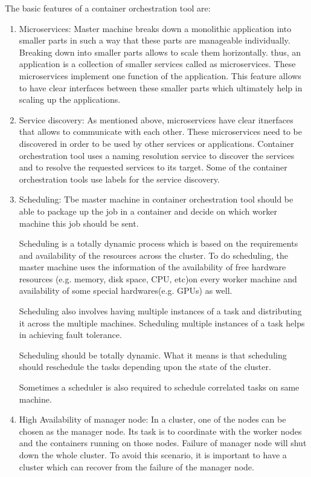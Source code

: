 The basic features of a container orchestration tool are:
\begin{enumerate}
\item Microservices:
Master machine breaks down a monolithic application into smaller parts in such a way that these parts are manageable individually. Breaking down into smaller parts allows to scale them horizontally. thus, an application is a collection of smaller services called as microservices. These microservices implement one function of the application. This feature allows to have clear interfaces between these smaller parts which ultimately help in scaling up the applications.

\item Service discovery:
As mentioned above, microservices have clear itnerfaces that allows to communicate with each other. These microservices need to be discovered in order to be used by other services or applications. Container orchestration tool uses a naming resolution service to discover the services and to resolve the requested services to its target. Some of the container orchestration tools use labels for the service discovery.

\item Scheduling: Tbe master machine in container orchestration tool should be able to package up the job in a container and decide on which worker machine this job should be sent. 

Scheduling is a totally dynamic process which is based on the requirements and availability of the resources across the cluster. To do scheduling, the master machine uses the information of the availability of free hardware resources (e.g. memory, disk space, CPU, etc)on every worker machine and availability of some special hardwares(e.g. GPUs) as well.

Scheduling also involves having multiple instances of a task and distributing it across the multiple machines. Scheduling multiple instances of a task helps in achieving fault tolerance.

Scheduling should be totally dynamic. What it means is that scheduling should reschedule the tasks depending upon the state of the cluster.

Sometimes a scheduler is also required to schedule correlated tasks on same machine.

\item High Availability of manager node: In a cluster, one of the nodes can be chosen as the manager node. Its task is to coordinate with the worker nodes and the containers running on those nodes. Failure of manager node will shut down the whole cluster. To avoid this scenario, it is important to have a cluster which can recover from the failure of the manager node.



\end{enumerate}
